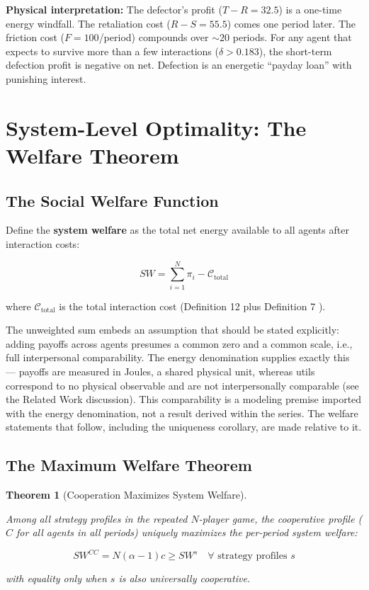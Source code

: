 \documentclass[11pt]{article}
\theoremstyle{plain}
\newtheorem{theorem}{Theorem}
\theoremstyle{definition}
\theoremstyle{remark}
\let\origsection\section
\renewcommand{\section}{\needspace{12\baselineskip}\origsection}
\let\origsubsection\subsection
\renewcommand{\subsection}{\needspace{7\baselineskip}\origsubsection}
\begin{document}
\textbf{Physical interpretation:} The defector's profit
(\(T - R = 32.5\)) is a one-time energy windfall. The retaliation cost
(\(R - S = 55.5\)) comes one period later. The friction cost
(\(F = 100\)/period) compounds over \(\sim 20\) periods. For any agent
that expects to survive more than a few interactions
(\(\delta > 0.183\)), the short-term defection profit is negative on
net. Defection is an energetic ``payday loan'' with punishing interest.

\section{System-Level Optimality: The Welfare
Theorem}\label{system-level-optimality-the-welfare-theorem}

\subsection{The Social Welfare
Function}\label{the-social-welfare-function}

Define the \textbf{system welfare} as the total net energy available to
all agents after interaction costs:

\[SW = \sum_{i=1}^{N} \pi_i - \mathcal{C}_{\text{total}}\]

where \(\mathcal{C}_{\text{total}}\) is the total interaction cost
(Definition 12 \citep{TC-IV} plus Definition 7 \citep{TC-II}).

The unweighted sum embeds an assumption that should be stated
explicitly: adding payoffs across agents presumes a common zero and a
common scale, i.e., full interpersonal comparability. The energy
denomination supplies exactly this --- payoffs are measured in Joules, a
shared physical unit, whereas utils correspond to no physical observable
and are not interpersonally comparable (see the Related Work
discussion). This comparability is a modeling premise imported with the
energy denomination, not a result derived within the series. The welfare
statements that follow, including the uniqueness corollary, are made
relative to it.

\subsection{The Maximum Welfare
Theorem}\label{the-maximum-welfare-theorem}

\begin{theorem}[Cooperation Maximizes System Welfare]
\label{thm-cooperation-maximizes-welfare}

Among all strategy profiles in the repeated $N$-player game, the cooperative profile ($C$ for all agents in all periods) uniquely maximizes the per-period system welfare:

$$SW^{CC} = N(\alpha - 1)c \geq SW^{s} \quad \forall \text{ strategy profiles } s$$

with equality only when $s$ is also universally cooperative.
\end{theorem}
\end{document}
